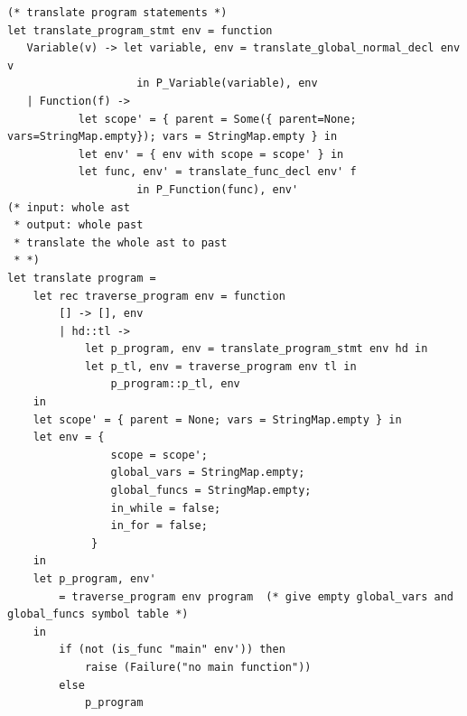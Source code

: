 \documentclass[12pt]{article} %
\begin{document}
\begin{lstlisting}[style=appendix, caption=translate.ml]
(* translate program statements *)
let translate_program_stmt env = function
   Variable(v) -> let variable, env = translate_global_normal_decl env v
                    in P_Variable(variable), env
   | Function(f) -> 
           let scope' = { parent = Some({ parent=None; vars=StringMap.empty}); vars = StringMap.empty } in
           let env' = { env with scope = scope' } in
           let func, env' = translate_func_decl env' f
                    in P_Function(func), env'
(* input: whole ast
 * output: whole past
 * translate the whole ast to past
 * *)
let translate program =
    let rec traverse_program env = function
        [] -> [], env
        | hd::tl -> 
            let p_program, env = translate_program_stmt env hd in
            let p_tl, env = traverse_program env tl in
                p_program::p_tl, env
    in
    let scope' = { parent = None; vars = StringMap.empty } in
    let env = { 
                scope = scope'; 
                global_vars = StringMap.empty; 
                global_funcs = StringMap.empty;
                in_while = false;
                in_for = false;
             }
    in 
    let p_program, env' 
        = traverse_program env program  (* give empty global_vars and global_funcs symbol table *)
    in 
        if (not (is_func "main" env')) then 
            raise (Failure("no main function")) 
        else
            p_program
\end{lstlisting}
\end{document}
